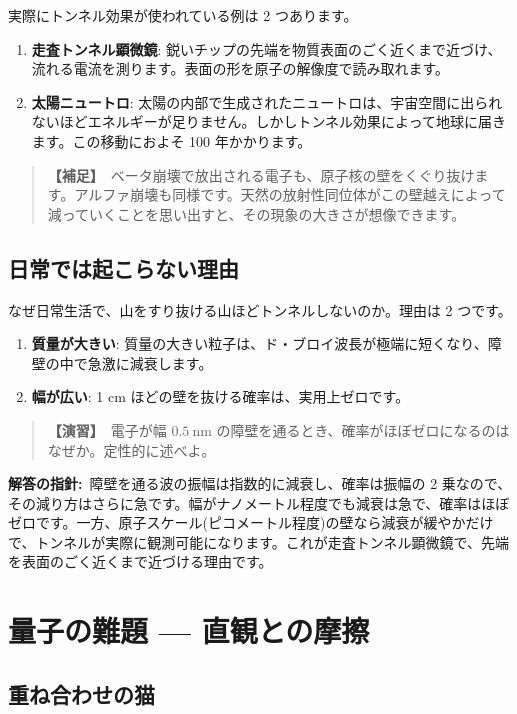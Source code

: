\documentclass{article}
\begin{document}
実際にトンネル効果が使われている例は 2 つあります。
\begin{enumerate}
\item \textbf{走査トンネル顕微鏡}: 鋭いチップの先端を物質表面のごく近くまで近づけ、流れる電流を測ります。表面の形を原子の解像度で読み取れます。
\item \textbf{太陽ニュートロ}: 太陽の内部で生成されたニュートロは、宇宙空間に出られないほどエネルギーが足りません。しかしトンネル効果によって地球に届きます。この移動におよそ 100 年かかります。
\end{enumerate}

\begin{quote}
\textbf{【補足】}\ ベータ崩壊で放出される電子も、原子核の壁をくぐり抜けます。アルファ崩壊も同様です。天然の放射性同位体がこの壁越えによって減っていくことを思い出すと、その現象の大きさが想像できます。
\end{quote}

\subsection{日常では起こらない理由}

なぜ日常生活で、山をすり抜ける山ほどトンネルしないのか。理由は 2 つです。
\begin{enumerate}
\item \textbf{質量が大きい}: 質量の大きい粒子は、ド・ブロイ波長が極端に短くなり、障壁の中で急激に減衰します。
\item \textbf{幅が広い}: 1 cm ほどの壁を抜ける確率は、実用上ゼロです。
\end{enumerate}

\begin{quote}
\textbf{【演習】}\ 電子が幅 \(0.5 \ \mathrm{nm}\) の障壁を通るとき、確率がほぼゼロになるのはなぜか。定性的に述べよ。
\end{quote}

\textbf{解答の指針:}\ 障壁を通る波の振幅は指数的に減衰し、確率は振幅の 2 乗なので、その減り方はさらに急です。幅がナノメートル程度でも減衰は急で、確率はほぼゼロです。一方、原子スケール(ピコメートル程度)の壁なら減衰が緩やかだけで、トンネルが実際に観測可能になります。これが走査トンネル顕微鏡で、先端を表面のごく近くまで近づける理由です。

\section{量子の難題 — 直観との摩擦}

\subsection{重ね合わせの猫}
\end{document}
